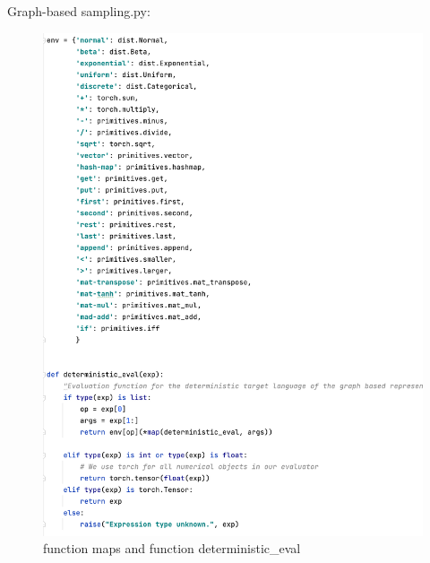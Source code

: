 \documentclass{article}
\begin{document}
\begin{enumerate}
\newpage

Graph-based sampling.py:
\begin{figure}[!htp]
	\centering
	\includegraphics[scale=0.6]{../figs/graph_code1}
	\caption{function maps and function deterministic_eval}
\end{figure}


\end{enumerate}
\end{document}
